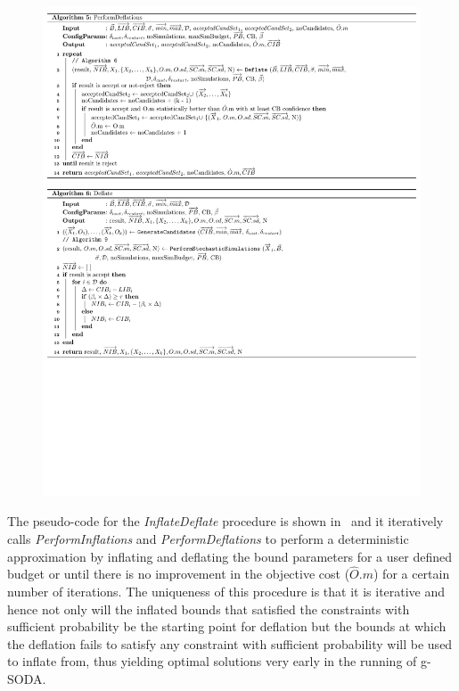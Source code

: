 \documentclass[a4paper, 12pt]{article} %
\begin{document}
\begin{figure}
\begin{minipage}[t]{.5\textwidth}
\begin{center}
\includegraphics[width=1\textwidth]{pseudoCode/Algo5-6.pdf}
	\end{center}
\end{minipage}
\end{figure}

The pseudo-code for the \textit{InflateDeflate} procedure is shown in \algoInflDefl~and it iteratively calls \textit{PerformInflations} and \textit{PerformDeflations} to perform a deterministic approximation by inflating and deflating the bound parameters for a user defined budget or until there is no improvement in the objective cost ($\hat{O}.m$) for a certain number of iterations. The uniqueness of this procedure is that it is iterative and hence not only will the inflated bounds that satisfied the constraints with sufficient probability be the starting point for deflation but the bounds at which the deflation fails to satisfy any constraint with sufficient probability will be used to inflate from, thus yielding optimal solutions very early in the running of g-SODA.
\end{document}
